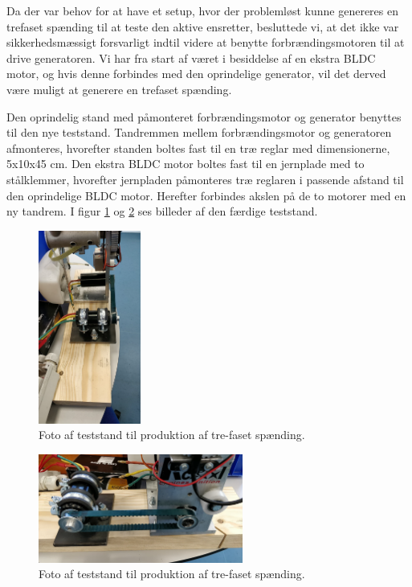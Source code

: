 Da der var behov for at have et setup, hvor der problemløst kunne genereres en trefaset spænding til at teste den aktive ensretter, besluttede vi, at det ikke var sikkerhedsmæssigt forsvarligt indtil videre at benytte forbrændingsmotoren til at drive generatoren. Vi har fra start af været i besiddelse af en ekstra BLDC motor, og hvis denne forbindes med den oprindelige generator, vil det derved være muligt at generere en trefaset spænding.

Den oprindelig stand med påmonteret forbrændingsmotor og generator benyttes til den nye teststand. Tandremmen mellem forbrændingsmotor og generatoren afmonteres, hvorefter standen boltes fast til en træ reglar med dimensionerne, 5x10x45 cm. Den ekstra BLDC motor boltes fast til en jernplade med to stålklemmer, hvorefter jernpladen påmonteres træ reglaren i passende afstand til den oprindelige BLDC motor. Herefter forbindes akslen på de to motorer med en ny tandrem. I figur \ref{fig:nt1} og \ref{fig:nt2} ses billeder af den færdige teststand.
\clearpage
\begin{figure}[h]
  \centering
  \includegraphics[width=0.3\textwidth]{./figurer/nt1.png}
  \caption{Foto af teststand til produktion af tre-faset spænding.}
  \label{fig:nt1}
\end{figure}

\begin{figure}[h]
  \centering
  \includegraphics[width=0.6\textwidth]{./figurer/nt2.png}
  \caption{Foto af teststand til produktion af tre-faset spænding.}
  \label{fig:nt2}
\end{figure}

